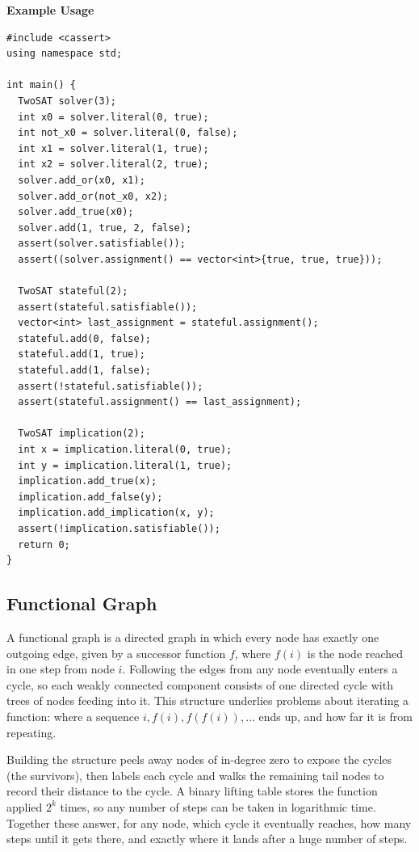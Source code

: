 \textbf{Example Usage}\par
\begin{lstlisting}[style=cpp]
#include <cassert>
using namespace std;

int main() {
  TwoSAT solver(3);
  int x0 = solver.literal(0, true);
  int not_x0 = solver.literal(0, false);
  int x1 = solver.literal(1, true);
  int x2 = solver.literal(2, true);
  solver.add_or(x0, x1);
  solver.add_or(not_x0, x2);
  solver.add_true(x0);
  solver.add(1, true, 2, false);
  assert(solver.satisfiable());
  assert((solver.assignment() == vector<int>{true, true, true}));

  TwoSAT stateful(2);
  assert(stateful.satisfiable());
  vector<int> last_assignment = stateful.assignment();
  stateful.add(0, false);
  stateful.add(1, true);
  stateful.add(1, false);
  assert(!stateful.satisfiable());
  assert(stateful.assignment() == last_assignment);

  TwoSAT implication(2);
  int x = implication.literal(0, true);
  int y = implication.literal(1, true);
  implication.add_true(x);
  implication.add_false(y);
  implication.add_implication(x, y);
  assert(!implication.satisfiable());
  return 0;
}
\end{lstlisting}
\subsection{Functional Graph}
\label{sec:4.2.9}
A functional graph is a directed graph in which every node has exactly one outgoing edge, given by a successor function $f$, where $f(i)$ is the node reached in one step from node $i$. Following the edges from any node eventually enters a cycle, so each weakly connected component consists of one directed cycle with trees of nodes feeding into it. This structure underlies problems about iterating a function: where a sequence $i, f(i), f(f(i)), \ldots$ ends up, and how far it is from repeating.

Building the structure peels away nodes of in-degree zero to expose the cycles (the survivors), then labels each cycle and walks the remaining tail nodes to record their distance to the cycle. A binary lifting table stores the function applied $2^k$ times, so any number of steps can be taken in logarithmic time. Together these answer, for any node, which cycle it eventually reaches, how many steps until it gets there, and exactly where it lands after a huge number of steps.

